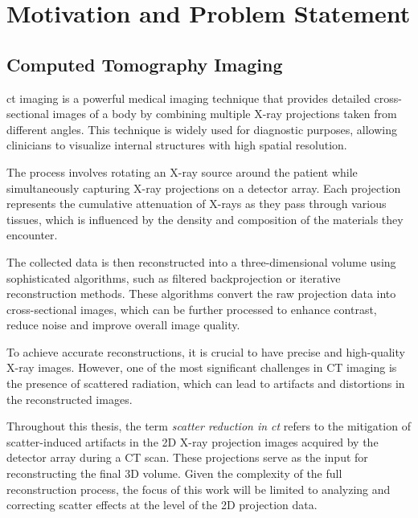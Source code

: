 
\chapter{Motivation and Problem Statement} %

\label{Chapter6}


\section{Computed Tomography Imaging}

\ac{ct} imaging is a powerful medical imaging technique that provides detailed
cross-sectional images of a body by combining multiple X-ray projections taken
from different angles. This technique is widely used for diagnostic purposes,
allowing clinicians to visualize internal structures with high spatial
resolution.

The process involves rotating an X-ray source around the patient while
simultaneously capturing X-ray projections on a detector array. Each projection
represents the cumulative attenuation of X-rays as they pass through various
tissues, which is influenced by the density and composition of the materials
they encounter. 

The collected data is then reconstructed into a three-dimensional volume
using sophisticated algorithms, such as filtered backprojection or iterative
reconstruction methods. These algorithms convert the raw projection data into
cross-sectional images, which can be further processed to enhance contrast,
reduce noise and improve overall image quality.

To achieve accurate reconstructions, it is crucial to have precise and high-quality X-ray images. However, one of the most significant challenges in CT imaging is
the presence of scattered radiation, which can lead to artifacts and distortions
in the reconstructed images.

Throughout this thesis, the term \textit{scatter reduction in \ac{ct}} refers to the mitigation of scatter-induced artifacts in the 2D X-ray projection images acquired by the detector array during a CT scan. These projections serve as the input for reconstructing the final 3D volume. Given the complexity of the full reconstruction process, the focus of this work will be limited to analyzing and correcting scatter effects at the level of the 2D projection data. 


